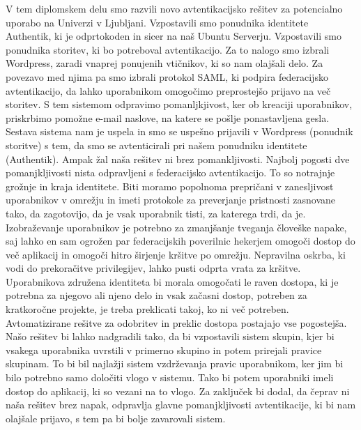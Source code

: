 \documentclass[a4paper,12pt,openright]{book}
\begin{document}
V tem diplomskem delu smo razvili novo avtentikacijsko rešitev za potencialno uporabo na Univerzi v Ljubljani. Vzpostavili smo ponudnika identitete Authentik, ki je odprtokoden in sicer na naš Ubuntu Serverju. Vzpostavili smo ponudnika storitev, ki bo potreboval avtentikacijo. Za to nalogo smo izbrali Wordpress, zaradi vnaprej ponujenih vtičnikov, ki so nam olajšali delo. Za povezavo med njima pa smo izbrali protokol SAML, ki podpira federacijsko avtentikacijo, da lahko uporabnikom omogočimo preprostejšo prijavo na več storitev. 
\newline
S tem sistemom odpravimo pomanljkjivost, ker ob kreaciji uporabnikov, priskrbimo pomožne e-mail naslove, na katere se pošlje ponastavljena gesla. 
\newline
Sestava sistema nam je uspela in smo se uspešno prijavili v Wordpress (ponudnik storitve) s tem, da smo se avtenticirali pri našem ponudniku identitete (Authentik). 
\newline
Ampak žal naša rešitev ni brez pomankljivosti. Najbolj pogosti dve pomanjkljivosti nista odpravljeni s federacijsko avtentikacijo. To so notrajnje grožnje in kraja identitete. Biti moramo popolnoma prepričani v zanesljivost uporabnikov v omrežju in imeti protokole za preverjanje pristnosti zasnovane tako, da zagotovijo, da je vsak uporabnik tisti, za katerega trdi, da je. Izobraževanje uporabnikov je potrebno za zmanjšanje tveganja človeške napake, saj lahko en sam ogrožen par federacijskih poverilnic hekerjem omogoči dostop do več aplikacij in omogoči hitro širjenje kršitve po omrežju.
Nepravilna oskrba, ki vodi do prekoračitve privilegijev, lahko pusti odprta vrata za kršitve. Uporabnikova združena identiteta bi morala omogočati le raven dostopa, ki je potrebna za njegovo ali njeno delo in vsak začasni dostop, potreben za kratkoročne projekte, je treba preklicati takoj, ko ni več potreben. Avtomatizirane rešitve za odobritev in preklic dostopa postajajo vse pogostejša.
\newline
Našo rešitev bi lahko nadgradili tako, da bi vzpostavili sistem skupin, kjer bi vsakega uporabnika uvrstili v primerno skupino in potem prirejali pravice skupinam. To bi bil najlažji sistem vzdrževanja pravic uporabnikom, ker jim bi bilo potrebno samo določiti vlogo v sistemu. Tako bi potem uporabniki imeli dostop do aplikacij, ki so vezani na to vlogo. 
\newline
Za zaključek bi dodal, da čeprav ni naša rešitev brez napak, odpravlja glavne pomanjkljivosti avtentikacije, ki bi nam olajšale prijavo, s tem pa bi bolje zavarovali sistem. 


\cleardoublepage

\printbibliography[heading=bibintoc,type=article,title={Članki v revijah}]

\printbibliography[heading=bibintoc,type=inproceedings,title={Članki v zbornikih}]

\printbibliography[heading=bibintoc,type=incollection,title={Poglavja v knjigah}]

\printbibliography[heading=bibintoc,title={Celotna literatura}]
\end{document}
